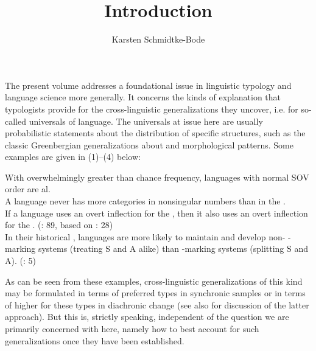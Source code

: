 \documentclass[output=paper]{langsci/langscibook}
\author{Karsten Schmidtke-Bode\affiliation{Leipzig University and Friedrich Schiller University Jena}}
\title{Introduction}
\begin{document}
\maketitle 
 




\noindent The present volume addresses a foundational issue in linguistic typology and language science more generally. It concerns the kinds of explanation that typologists provide for the cross-linguistic generalizations they uncover, i.e. for so-called universals of language. The universals at issue here are usually probabilistic statements about the distribution of specific structures, such as the classic Greenbergian  generalizations about  and morphological  patterns. Some examples are given in (1)–(4) below:

\ea 
{With overwhelmingly greater than chance frequency, languages with normal SOV order are al. \citep[62]{Greenberg1963}}\\
\z
\ea
{A language never has more  categories in nonsingular numbers than in the . \citep[75]{Greenberg1963}}\\
\z
\ea
{If a language uses an overt inflection for the , then it also uses an overt inflection for the . (\citealt{Croft2003}: 89, based on \citealt{Greenberg1966}: 28)}\\
\z 
\ea
{In their historical , languages are more likely to maintain and develop non- -marking systems (treating S and A alike) than  -marking systems (splitting S and A). (\citealt{BickelEtAl2015}: 5)}\\
\z

As can be seen from these examples, cross-linguistic generalizations of this kind may be formulated in terms of preferred types in synchronic samples or in terms of higher  for these types in diachronic change (see also \citealt{Greenberg1978_Diachr,Maslova2000,Cysouw2011,Bickel2013} for discussion of the latter approach). But this is, strictly speaking, independent of the question we are primarily concerned with here, namely how to best account for such generalizations once they have been established.
\end{document}
